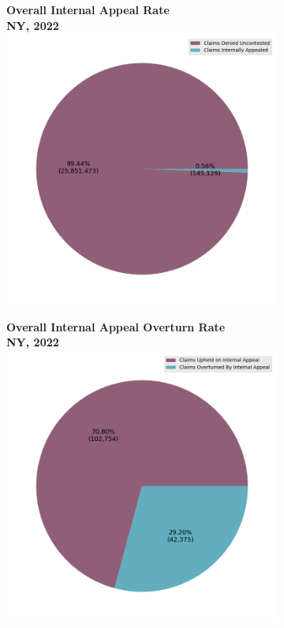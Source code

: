\documentclass[12pt, a4paper,twoside,parskip=full]{report}
\theoremstyle{plain} %
\theoremstyle{definition} %
\theoremstyle{remark} %
\numberwithin{equation}{chapter}
\begin{document}
		
		\begin{figure}[h!]
			\centering
			\begin{subfigure}[b]{0.49\textwidth}
				\centering
				\textbf{Overall Internal Appeal Rate}\\
				\textbf{NY, 2022}\\
				\includegraphics[width=\textwidth]{images/ny_claim_reports/internal_appeal_pie.png}
			\end{subfigure}
			\hfill
			\begin{subfigure}[b]{0.49\textwidth}
				\centering
				\textbf{Overall Internal Appeal Overturn Rate}\\
				\textbf{NY, 2022}\\
				\includegraphics[width=\textwidth]{images/ny_claim_reports/internal_appeal_overturns_pie.png}

\end{subfigure}
\end{figure}
\end{document}
